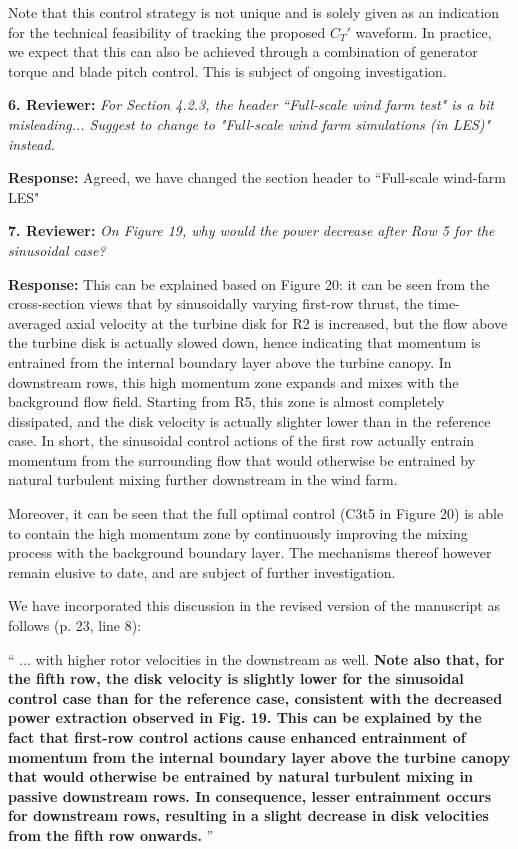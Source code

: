 \documentclass[]{article}
\begin{document}
Note that this control strategy is not unique and is solely given as an indication for the technical feasibility of tracking the proposed $C_T'$ waveform. In practice, we expect that this can also be achieved through a combination of generator torque and blade pitch control. This is subject of ongoing investigation.  

\dotfill

\textbf{6. Reviewer: } \textit{For Section 4.2.3, the header ``Full-scale wind farm test" is a bit misleading... Suggest
	to change to "Full-scale wind farm simulations (in LES)" instead.}

\textbf{Response: } Agreed, we have changed the section header to ``Full-scale wind-farm LES"

\dotfill

\textbf{7. Reviewer: } \textit{On Figure 19, why would the power decrease after Row 5 for the sinusoidal case?}

\textbf{Response: } This can be explained based on Figure 20: it can be seen from the cross-section views that by sinusoidally varying first-row thrust, the time-averaged axial velocity at the turbine disk for R2 is increased, but the flow above the turbine disk is actually slowed down, hence indicating that momentum is entrained from the internal boundary layer above the turbine canopy. In downstream rows, this high momentum zone expands and mixes with the background flow field. Starting from R5, this zone is almost completely dissipated, and the disk velocity is actually slighter lower than in the reference case. In short, the sinusoidal control actions of the first row actually entrain momentum from the surrounding flow that would otherwise be entrained by natural turbulent mixing further downstream in the wind farm. 

Moreover, it can be seen that the full optimal control (C3t5 in Figure 20) is able to contain the high momentum zone by continuously improving the mixing process with the background boundary layer. The mechanisms thereof however remain elusive to date, and are subject of further investigation. 

We have incorporated this discussion in the revised version of the manuscript as follows (p. 23, line 8): 

``
... with higher rotor velocities in the downstream as well.  \textbf{Note also that, for the fifth row, the disk velocity is slightly lower for the sinusoidal control case than for the reference case, consistent with the decreased power extraction observed in Fig. 19. This can be explained by the fact that first-row control actions cause enhanced entrainment of momentum from the internal boundary layer above the turbine canopy that would otherwise be entrained by natural turbulent mixing in passive downstream rows. In consequence, lesser entrainment occurs for downstream rows, resulting in a slight decrease in disk velocities from the fifth row onwards.}
''
\end{document}
